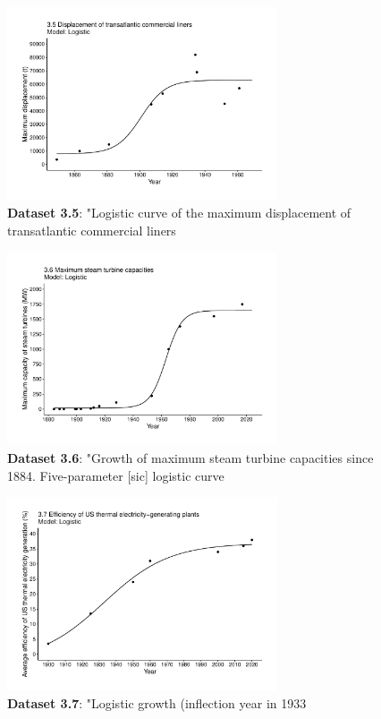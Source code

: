 \documentclass[aps,rmp,preprint,superscriptaddress,10pt,onecolumn]{article}
\begin{document}
\begin{figure}[h]
\includegraphics[width=8cm]{output/figs-ggplot/3.5.pdf}
\caption{\textbf{Dataset 3.5}: "Logistic curve of the maximum displacement of transatlantic commercial liners}
\end{figure}
	
\begin{figure}[h]
\includegraphics[width=8cm]{output/figs-ggplot/3.6.pdf}
\caption{\textbf{Dataset 3.6}: "Growth of maximum steam turbine capacities since 1884. Five-parameter [sic] logistic curve}
\end{figure}
	
\begin{figure}[h]
\includegraphics[width=8cm]{output/figs-ggplot/3.7.pdf}
\caption{\textbf{Dataset 3.7}: "Logistic growth (inflection year in 1933}
\end{figure}
	
\end{document}
